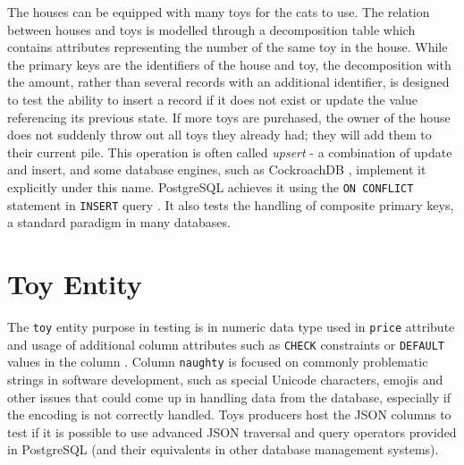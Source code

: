 The houses can be equipped with many toys for the cats to use. The relation
between houses and toys is modelled through a decomposition table which contains
attributes representing the number of the same toy in the house. While the
primary keys are the identifiers of the house and toy, the decomposition with
the amount, rather than several records with an additional identifier, is
designed to test the ability to insert a record if it does not exist or update
the value referencing its previous state. If more toys are purchased, the owner
of the house does not suddenly throw out all toys they already had; they will
add them to their current pile. This operation is often called \textit{upsert} -
a combination of update and insert, and some database engines, such as
CockroachDB \cite{upsertCockroachDB}, implement it explicitly under this name.
PostgreSQL achieves it using the \texttt{ON CONFLICT} statement in
\texttt{INSERT} query \cite{INSERT_postgres_2023}. It also tests the handling of
composite primary keys, a standard paradigm in many databases.

\section{Toy Entity}
The \texttt{toy} entity purpose in testing is in numeric data type used in
\texttt{price} attribute and usage of additional column attributes such as
\texttt{CHECK} constraints or \texttt{DEFAULT} values in the column
\cite{Constraints_Postgres_2023}. Column \texttt{naughty} is focused on commonly
problematic strings in software development, such as special Unicode characters,
emojis and other issues that could come up in handling data from the database,
especially if the encoding is not correctly handled. Toys producers host the
JSON columns to test if it is possible to use advanced JSON traversal and query
operators provided in PostgreSQL \cite{postgres-json} (and their equivalents in
other database management systems).
